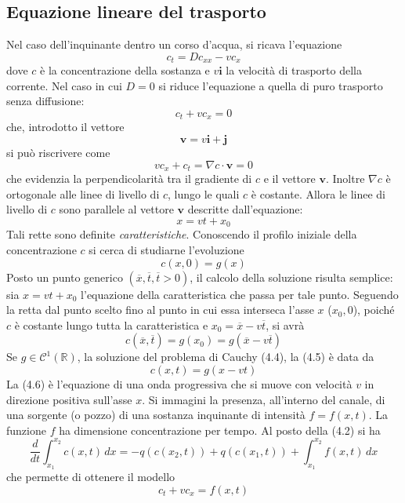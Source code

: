 \documentclass[a4paper,12pt, draft]{article}
\theoremstyle{break}
\numberwithin{equation}{section}
\begin{document}
\subsection{Equazione lineare del trasporto}
Nel caso dell'inquinante dentro un corso d'acqua, si ricava l'equazione
\[
  c_t = Dc_{xx} -vc_x
\]
dove \(c\) è la concentrazione della sostanza e \(v\bm{i}\) la velocità di trasporto della corrente. Nel caso in cui \(D = 0\) si riduce l'equazione a quella di puro trasporto senza diffusione:
\begin{equation}
  c_t + vc_x = 0
\end{equation}
che, introdotto il vettore
\[
  \bm{v} = v\bm{i} + \bm{j}
\]
si può riscrivere come 
\[
  vc_x + c_t = \nabla c \cdot \bm{v} = 0
\]
che evidenzia la perpendicolarità tra il gradiente di \(c\) e il vettore \(\bm{v}\). Inoltre \(\nabla c\) è ortogonale alle linee di livello di \(c\), lungo le quali \(c\) è costante. Allora le linee di livello di \(c\) sono parallele al vettore \(\bm{v}\) descritte dall'equazione:
\[
x=vt+x_0  
\]
Tali rette sono definite \emph{caratteristiche}. Conoscendo il profilo iniziale della concentrazione \(c\) si cerca di studiarne l'evoluzione
\begin{equation}
c(x, 0) = g(x)  
\end{equation}
Posto un punto generico \((\overline{x}, \overline{t}, \overline{t}>0)\), il calcolo della soluzione risulta semplice: sia \(x = vt + x_0\) l'equazione della caratteristica che passa per tale punto. Seguendo la retta dal punto scelto fino al punto in cui essa interseca l'asse \(x\) (\(x_0, 0\)), poiché \(c\) è costante lungo tutta la caratteristica e \(x_0 = \overline{x} - v\overline{t}\), si avrà 
\[
  c(\overline{x}, \overline{t}) = g(x_0) = g(\overline{x} -v\overline{t})  
\]
Se \(g \in \mathcal{C}^1(\mathbb{R})\), la soluzione del problema di Cauchy (4.4), la (4.5) è data da 
\begin{equation}
  c(x,t) = g(x -vt)
\end{equation}
La (4.6) è l'equazione di una onda progressiva che si muove con velocità \(v\) in direzione positiva sull'asse \(x\). Si immagini la presenza, all'interno del canale, di una sorgente (o pozzo) di una sostanza inquinante di intensità \(f = f(x,t)\). La funzione \(f\) ha dimensione concentrazione per tempo. Al posto della (4.2) si ha 
\[
  \frac{d}{dt}\int_{x_1}^{x_2} c(x,t) \, dx = -q(c(x_2,t)) + q(c(x_1, t)) + \int_{x_1}^{x_2}f(x,t) \, dx
\] 
che permette di ottenere il modello 
\begin{equation}
  c_t + vc_x = f(x,t)
\end{equation}
\end{document}
